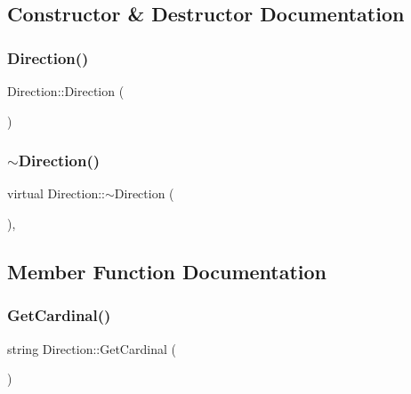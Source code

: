 \subsection{Constructor \& Destructor Documentation}
\mbox{\label{class_direction_aba0c848f9db9831e6feb64d978e6d019}} 
\subsubsection{\texorpdfstring{Direction()}{Direction()}}
{\footnotesize\ttfamily Direction\+::\+Direction (\begin{DoxyParamCaption}{ }\end{DoxyParamCaption})\hspace{0.3cm}{\ttfamily [inline]}}

\mbox{\label{class_direction_a9dc10040126d32d44f5e683ec940e3cd}} 
\subsubsection{\texorpdfstring{$\sim$\+Direction()}{~Direction()}}
{\footnotesize\ttfamily virtual Direction\+::$\sim$\+Direction (\begin{DoxyParamCaption}{ }\end{DoxyParamCaption})\hspace{0.3cm}{\ttfamily [inline]}, {\ttfamily [virtual]}}



\subsection{Member Function Documentation}
\mbox{\label{class_direction_a267ec83b0dbc81a5fb6fbb4c675c3d87}} 
\subsubsection{\texorpdfstring{Get\+Cardinal()}{GetCardinal()}}
{\footnotesize\ttfamily string Direction\+::\+Get\+Cardinal (\begin{DoxyParamCaption}{ }\end{DoxyParamCaption})}

